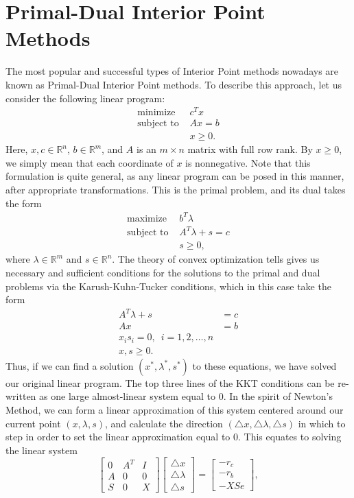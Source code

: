 \section*{Primal-Dual Interior Point Methods}
The most popular and successful types of Interior Point methods nowadays are known as Primal-Dual Interior Point methods. To 
describe this approach, let us consider the following linear program:
\begin{align*}
\text{minimize } &c^Tx\\
\text{subject to } &Ax = b\\
&x \geq 0.
\end{align*}
Here, $x, c \in \mathbb{R}^n$, $b \in \mathbb{R}^m$, and $A$ is an $m \times n$ matrix with full row rank. By $x \geq 0$, we 
simply mean that each coordinate of $x$ is nonnegative. Note that this formulation is quite general, as any linear program can be
posed in this manner, after appropriate transformations. This is the primal problem, and its dual takes the form
\begin{align*}
\text{maximize } &b^T\lambda\\
\text{subject to } &A^T\lambda + s = c\\
&s \geq 0,
\end{align*}
where $\lambda \in \mathbb{R}^m$ and $s \in \mathbb{R}^n$. The theory of convex optimization tells gives us necessary and sufficient
conditions for the solutions to the primal and dual problems via the Karush-Kuhn-Tucker conditions, which in this case take the form
\begin{align*}
A^T\lambda + s &= c\\
Ax &= b\\
x_is_i = 0, \,\,\, i = 1,2,\ldots,n\\
x, s \geq 0.
\end{align*}
Thus, if we can find a solution $(x^*, \lambda^*, s^*)$ to these equations, we have solved our original linear program. 
The top three lines of the KKT conditions can be re-written as one large almost-linear system equal to 0. In the spirit of
Newton's Method, we can form a linear approximation of this system centered around our current point $(x, \lambda, s)$, and
calculate the direction $(\triangle x, \triangle \lambda, \triangle s)$ in which to step in order to set the linear approximation 
equal to 0. This equates to solving the linear system
$$
\begin{bmatrix}
0 & A^T & I\\
A & 0 & 0\\
S & 0 & X
\end{bmatrix}
\begin{bmatrix}
\triangle x\\
\triangle \lambda\\
\triangle s
\end{bmatrix}
=
\begin{bmatrix}
-r_c\\
-r_b\\
-XSe
\end{bmatrix},
$$
